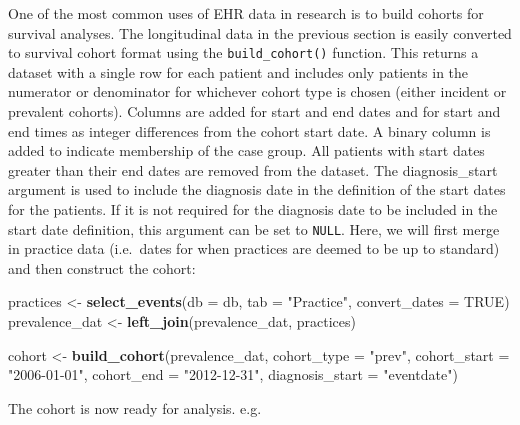 \documentclass[]{article}
\newenvironment{Shaded}{\begin{snugshade}}{\end{snugshade}}
\newcommand{\KeywordTok}[1]{\textcolor[rgb]{0.13,0.29,0.53}{\textbf{{#1}}}}
\newcommand{\DataTypeTok}[1]{\textcolor[rgb]{0.13,0.29,0.53}{{#1}}}
\newcommand{\StringTok}[1]{\textcolor[rgb]{0.31,0.60,0.02}{{#1}}}
\newcommand{\OtherTok}[1]{\textcolor[rgb]{0.56,0.35,0.01}{{#1}}}
\newcommand{\NormalTok}[1]{{#1}}
\begin{document}
One of the most common uses of EHR data in research is to build cohorts
for survival analyses. The longitudinal data in the previous section is
easily converted to survival cohort format using the
\texttt{build\_cohort()} function. This returns a dataset with a single
row for each patient and includes only patients in the numerator or
denominator for whichever cohort type is chosen (either incident or
prevalent cohorts). Columns are added for start and end dates and for
start and end times as integer differences from the cohort start date. A
binary column is added to indicate membership of the case group. All
patients with start dates greater than their end dates are removed from
the dataset. The diagnosis\_start argument is used to include the
diagnosis date in the definition of the start dates for the patients. If
it is not required for the diagnosis date to be included in the start
date definition, this argument can be set to \texttt{NULL}. Here, we
will first merge in practice data (i.e.~dates for when practices are
deemed to be up to standard) and then construct the cohort:

\begin{Shaded}
\begin{Highlighting}[]
\NormalTok{practices <-}\StringTok{ }\KeywordTok{select_events}\NormalTok{(}\DataTypeTok{db =} \NormalTok{db, }\DataTypeTok{tab =} \StringTok{"Practice"}\NormalTok{, }\DataTypeTok{convert_dates =} \OtherTok{TRUE}\NormalTok{)}
\NormalTok{prevalence_dat <-}\StringTok{ }\KeywordTok{left_join}\NormalTok{(prevalence_dat, practices)}

\NormalTok{cohort <-}\StringTok{ }\KeywordTok{build_cohort}\NormalTok{(prevalence_dat, }\DataTypeTok{cohort_type =} \StringTok{"prev"}\NormalTok{, }
                       \DataTypeTok{cohort_start =} \StringTok{"2006-01-01"}\NormalTok{, }\DataTypeTok{cohort_end =} \StringTok{"2012-12-31"}\NormalTok{, }
                       \DataTypeTok{diagnosis_start =} \StringTok{"eventdate"}\NormalTok{)}
\end{Highlighting}
\end{Shaded}

The cohort is now ready for analysis. e.g.
\end{document}
